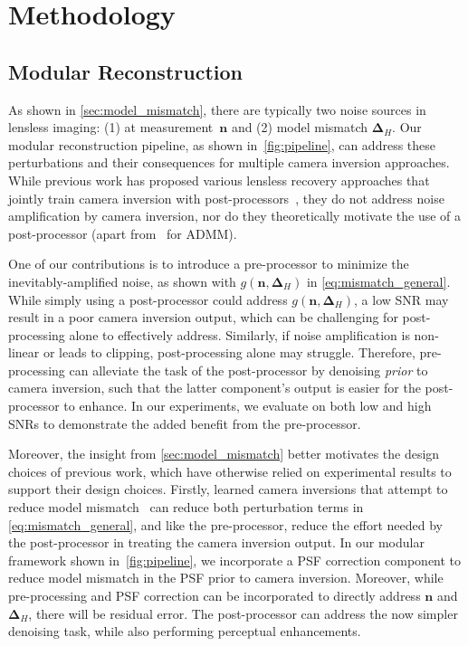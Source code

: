\section{Methodology}
\label{sec:methodology}

\subsection{Modular Reconstruction}
\label{sec:modular}

\noindent As shown in \cref{sec:model_mismatch}, there are typically two noise sources in lensless imaging: (1) at measurement~$\bm{n}$ and (2) model mismatch $\bm{\Delta}_H$.
Our modular reconstruction pipeline, 
as shown in~\cref{fig:pipeline},
can address these perturbations and their consequences
for multiple camera inversion approaches.
While previous work has proposed various lensless recovery approaches that jointly train camera inversion with post-processors~\cite{Monakhova:19, 9239993},
they do not address noise amplification by camera inversion, nor do they theoretically motivate the use of a post-processor 
(apart from~\cite{9546648} for ADMM).

One of our contributions is to introduce a pre-processor to minimize the inevitably-amplified noise,
as shown with $g(\bm{n}, \bm{\Delta}_H)$ in \cref{eq:mismatch_general}.
While simply using a post-processor could address $g(\bm{n}, \bm{\Delta}_H)$, a low SNR may result in a poor camera inversion output, which can be challenging for post-processing alone to effectively address. 
Similarly, if noise amplification is non-linear or leads to clipping, post-processing alone may struggle.
Therefore, pre-processing can alleviate the task of the post-processor by denoising \textit{prior} to camera inversion,
such that the latter component's output is easier for the post-processor to enhance.
In our experiments, we evaluate on both low and high SNRs to demonstrate the added benefit from the pre-processor.

Moreover, the insight from \cref{sec:model_mismatch} better motivates the design choices of previous work, which have otherwise relied on experimental results to support their design choices.
Firstly, learned camera inversions that attempt to reduce model mismatch~\cite{9239993,Li:23,Kingshott:22} can reduce both perturbation terms in \cref{eq:mismatch_general},
and like the pre-processor, reduce the effort needed by the post-processor in treating the camera inversion output.
In our modular framework shown in~\cref{fig:pipeline}, we incorporate a PSF correction component to reduce model mismatch in the PSF prior to camera inversion. Moreover, while pre-processing and PSF correction can be incorporated to directly address $\bm{n}$ and $\bm{\Delta}_H$,
there will be residual error.
The post-processor can address the now simpler denoising task, while also performing perceptual enhancements.

